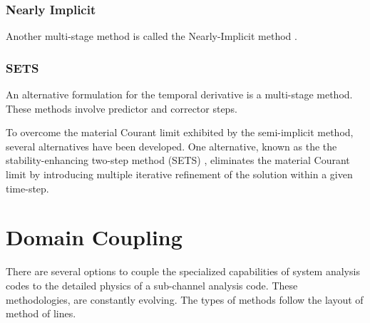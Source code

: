 \subsubsection{Nearly Implicit}
\label{subsubsect:numerics_nearly_implicit}
Another multi-stage method is called the Nearly-Implicit method \cite{Trapp1986}.

\subsubsection{SETS}
\label{subsubsect:numerics_sets}
An alternative formulation for the temporal derivative is a multi-stage method.
These methods involve predictor and corrector steps.

To overcome the material Courant limit exhibited by the semi-implicit method, several alternatives have been developed.
One alternative, known as the the stability-enhancing two-step method (SETS) \cite{Mahaffy1982}, eliminates the material Courant limit by introducing multiple iterative refinement of the solution within a given time-step.

\section{Domain Coupling}
\label{sect:code_coupling}
There are several options to couple the specialized capabilities of system analysis codes to the detailed physics of a sub-channel analysis code.
These methodologies, are constantly evolving.
The types of methods follow the layout of method of lines.

